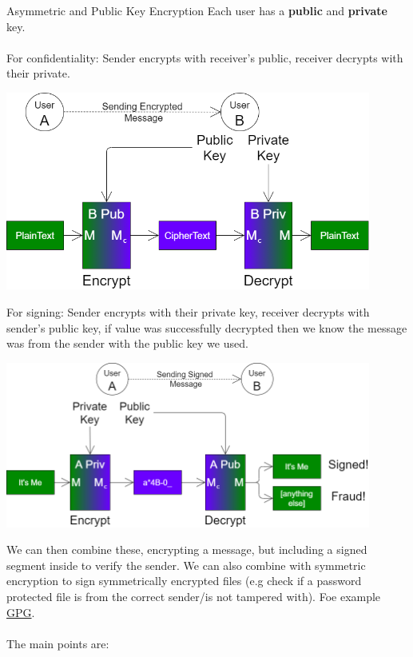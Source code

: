 \begin{definitionbox}{Asymmetric and Public Key Encryption}
    Each user has a \textbf{public} and \textbf{private} key.
    \\
    \\ For confidentiality: Sender encrypts with receiver's public, receiver decrypts with their private.
    \begin{center}\includegraphics[width=0.9\textwidth]{network_security/images/cryptography asymmetric confidential.png}\end{center}
    For signing: Sender encrypts with their private key, receiver decrypts with sender's public key, if value was successfully decrypted then we know the message was from the sender with the public key we used.
    \begin{center}\includegraphics[width=0.9\textwidth]{network_security/images/cryptography asymmetric sign.png}\end{center}
    We can then combine these, encrypting a message, but including a signed segment inside to verify the sender. We can also combine with symmetric encryption to sign symmetrically encrypted files (e.g check if a password protected file is from the correct sender/is not tampered with). Foe example \href{https://gnupg.org/}{GPG}.
    \\
    \\ The main points are:

\end{definitionbox}
